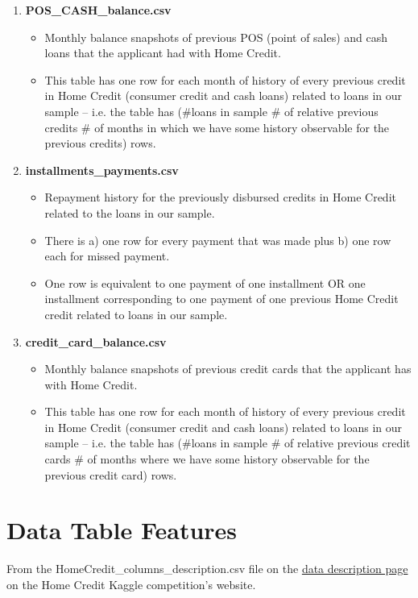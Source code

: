 \documentclass[12pt, letterpaper]{article}
\begin{document}
\begin{appendices}
\begin{enumerate}
\begin{itemize}
    \end{itemize}
  \item \textbf{POS_CASH_balance.csv}
    \begin{itemize}
      \item Monthly balance snapshots of previous POS (point of sales) and cash loans that the applicant had with Home Credit.
      \item This table has one row for each month of history of every previous credit in Home Credit (consumer credit and cash loans) related to loans in our sample – i.e. the table has (\#loans in sample \# of relative previous credits \# of months in which we have some history observable for the previous credits) rows.
    \end{itemize}
  \item \textbf{installments_payments.csv}
    \begin{itemize}
      \item Repayment history for the previously disbursed credits in Home Credit related to the loans in our sample.
      \item There is a) one row for every payment that was made plus b) one row each for missed payment.
      \item One row is equivalent to one payment of one installment OR one installment corresponding to one payment of one previous Home Credit credit related to loans in our sample.
    \end{itemize}
  \item \textbf{credit_card_balance.csv}
    \begin{itemize}
      \item Monthly balance snapshots of previous credit cards that the applicant has with Home Credit.
      \item This table has one row for each month of history of every previous credit in Home Credit (consumer credit and cash loans) related to loans in our sample – i.e. the table has (\#loans in sample \# of relative previous credit cards \# of months where we have some history observable for the previous credit card) rows.
    \end{itemize}
\end{enumerate}

\section{Data Table Features}
\label{appendix:datatablefeatures}
From the HomeCredit_columns_description.csv file on the \href{https://www.kaggle.com/c/home-credit-default-risk/data}{data description page} on the Home Credit Kaggle competition's website\cite{kagglehomecreditcompetitiondata}.

\end{appendices}
\end{document}
